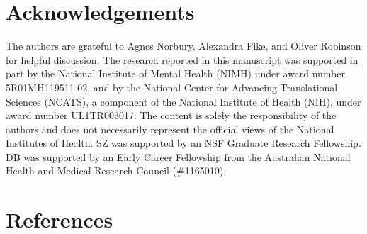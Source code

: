 \documentclass[a4paper,notitlepage,12pt]{article}
\begin{document}
\begin{refsection}[main]
\section{Acknowledgements}

The authors are grateful to Agnes Norbury, Alexandra Pike, and Oliver Robinson for helpful discussion. The research reported in this manuscript was supported in part by the National Institute of Mental Health (NIMH) under award number 5R01MH119511-02, and by the National Center for Advancing Translational Sciences (NCATS), a component of the National Institute of Health (NIH), under award number UL1TR003017. The content is solely the responsibility of the authors and does not necessarily represent the official views of the National Institutes of Health. SZ was supported by an NSF Graduate Research Fellowship. DB was supported by an Early Career Fellowship from the Australian National Health and Medical Research Council (\#1165010).

\section*{References}

\printbibliography[heading=main]
\end{refsection}

\break

\end{document}
